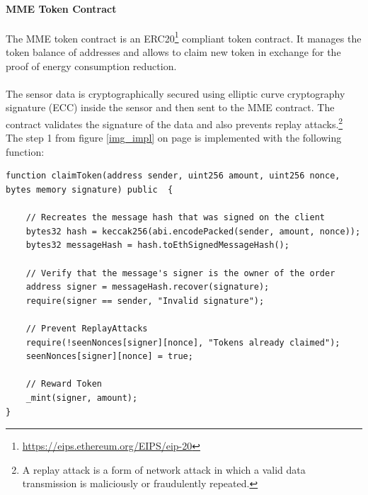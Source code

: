 \documentclass[11pt]{article}
\begin{document}
\paragraph{MME Token Contract}
The MME token contract is an ERC20\footnote{\href{https://eips.ethereum.org/EIPS/eip-20}{https://eips.ethereum.org/EIPS/eip-20}} compliant token contract. It manages the token balance of addresses and allows to claim new token in exchange for the proof of energy consumption reduction. \\\\
The sensor data is cryptographically secured using elliptic curve cryptography signature (ECC) \cite{24} inside the sensor and then sent to the MME contract. The contract validates the signature of the data and also prevents replay attacks.\footnote{A replay attack is a form of network attack in which a valid data transmission is maliciously or fraudulently repeated.}\\
The step 1 from figure \ref{img_impl} on page \pageref{img_impl} is implemented with the following function:
\begin{lstlisting}[language=Solidity, firstnumber=28,caption={src/smartcontracts/contracts/MMEToken.sol},captionpos=b]
function claimToken(address sender, uint256 amount, uint256 nonce, bytes memory signature) public  {

	// Recreates the message hash that was signed on the client
	bytes32 hash = keccak256(abi.encodePacked(sender, amount, nonce));
	bytes32 messageHash = hash.toEthSignedMessageHash();

	// Verify that the message's signer is the owner of the order
	address signer = messageHash.recover(signature);
	require(signer == sender, "Invalid signature");

	// Prevent ReplayAttacks
	require(!seenNonces[signer][nonce], "Tokens already claimed");
	seenNonces[signer][nonce] = true;

	// Reward Token
	_mint(signer, amount);
}
\end{lstlisting}
\end{document}
